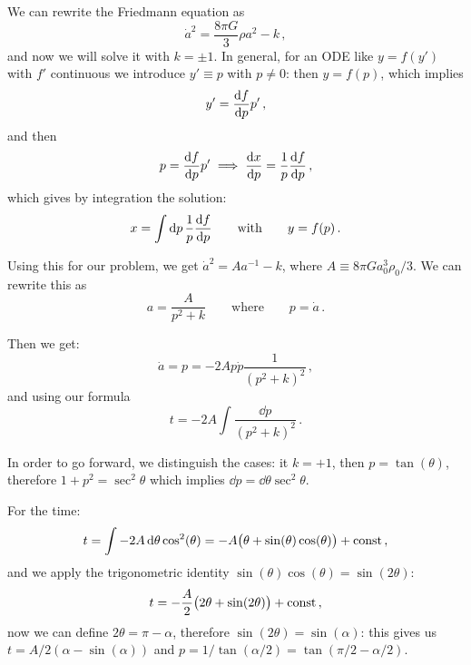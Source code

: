 \documentclass[main.tex]{subfiles}
\begin{document}
We can rewrite the Friedmann equation as 
%
\begin{equation}
  \dot{a}^2 = \frac{8 \pi G}{3} \rho a^2 - k
\,,
\end{equation}
%
and now we will solve it with \(k = \pm 1\).
In general, for an ODE like \(y = f(y')\) with \(f'\) continuous we introduce \(y' \equiv p\) with \(p \neq 0\): then \(y = f(p)\), which implies 
%
\begin{equation}
  y' = \dv{f}{p} p'
\,,
\end{equation}
%
and then 
%
\begin{equation}
  p = \dv{f}{p} p' \implies \dv{x}{p} = \frac{1}{p} \dv{f}{p}
\,,
\end{equation}
%
which gives by integration the solution: 
%
\begin{equation}
  x = \int  \dd{p} \frac{1}{p} \dv{f}{p}
  \qquad \text{with} \qquad
  y = f(p)
\,.
\end{equation}

Using this for our problem, we get \(\dot{a}^2 = A a^{-1} - k \), where \(A \equiv 8 \pi G a_0^3 \rho_0 /3\). We can rewrite this as 
%
\begin{equation}
  a = \frac{A}{p^2+k} 
  \qquad \text{where} \qquad
  p = \dot{a} 
\,.
\end{equation}

Then we get: 
%
\begin{equation}
  \dot{a} = p = -2A  p \dot{p} \frac{1}{(p^2+k)^2}
\,,
\end{equation}
%
and using our formula 
%
\begin{equation}
  t = -2A \int \frac{\dd{p} }{(p^2+k)^2}
\,.
\end{equation}

In order to go forward, we distinguish the cases: it \(k = +1\), then \(p = \tan(\theta ) \), therefore \(1 + p^2= \sec^2 \theta \) which implies \(\dd{p} = \dd{\theta } \sec^2 \theta  \).

For the time: 
%
\begin{equation}
  t = \int -2A \dd{\theta } \cos^2(\theta ) = -A \qty(\theta + \sin(\theta ) \cos(\theta ) ) + \text{const}
\,,
\end{equation}
%
and we apply the trigonometric identity \(\sin(\theta ) \cos(\theta ) = \sin(2 \theta ) \):
%
\begin{equation}
  t = -\frac{A}{2} \qty(2 \theta  + \sin(2 \theta ) ) + \const
\,,
\end{equation}
%
now we can define \(2 \theta  = \pi - \alpha \), therefore \(\sin(2\theta ) = \sin(\alpha )  \): this gives us
\(t = A/2 (\alpha - \sin(\alpha ) )\) and \(p = 1/\tan(\alpha /2) = \tan(\pi /2 - \alpha /2) \).
\end{document}
